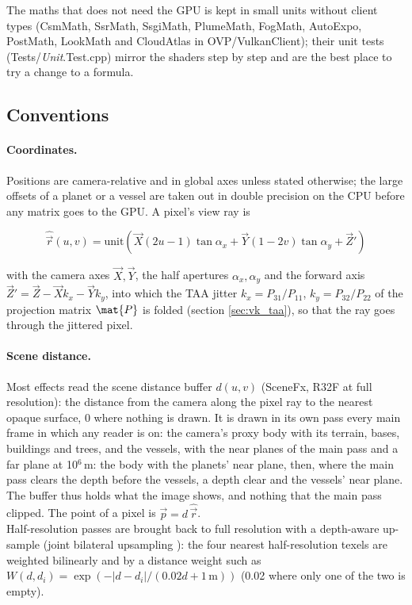 \documentclass[Orbiter Technical Reference.tex]{subfiles}
\begin{document}
\begin{sloppypar}
\noindent The maths that does not need the GPU is kept in small units without client types (CsmMath, SsrMath, SsgiMath, PlumeMath, FogMath, AutoExpo, PostMath, LookMath and CloudAtlas in OVP/VulkanClient); their unit tests (Tests/\textit{Unit}.Test.cpp) mirror the shaders step by step and are the best place to try a change to a formula.


\subsection{Conventions}\label{sec:vk_conv}
\paragraph{Coordinates.} Positions are camera-relative and in global axes unless stated otherwise; the large offsets of a planet or a vessel are taken out in double precision on the CPU before any matrix goes to the GPU. A pixel's view ray is

\[ \hat{\vec{r}}(u,v) = \mathrm{unit}\left( \vec{X} (2u-1) \tan\alpha_x + \vec{Y} (1-2v) \tan\alpha_y + \vec{Z}' \right) \]

\noindent
with the camera axes $\vec{X}, \vec{Y}$, the half apertures $\alpha_x, \alpha_y$ and the forward axis $\vec{Z}' = \vec{Z} - \vec{X} k_x - \vec{Y} k_y$, into which the TAA jitter $k_x = P_{31}/P_{11}$, $k_y = P_{32}/P_{22}$ of the projection matrix $\mat{P}$ is folded (section \ref{sec:vk_taa}), so that the ray goes through the jittered pixel.

\paragraph{Scene distance.} Most effects read the scene distance buffer $d(u,v)$ (SceneFx, R32F at full resolution): the distance from the camera along the pixel ray to the nearest opaque surface, 0 where nothing is drawn. It is drawn in its own pass every main frame in which any reader is on: the camera's proxy body with its terrain, bases, buildings and trees, and the vessels, with the near planes of the main pass and a far plane at 10$^{6}$\,m: the body with the planets' near plane, then, where the main pass clears the depth before the vessels, a depth clear and the vessels' near plane. The buffer thus holds what the image shows, and nothing that the main pass clipped. The point of a pixel is $\vec{p} = d\,\hat{\vec{r}}$.\\
Half-resolution passes are brought back to full resolution with a depth-aware up-sample (joint bilateral upsampling \cite{kopf2007}): the four nearest half-resolution texels are weighted bilinearly and by a distance weight such as $W(d,d_i) = \exp(-|d-d_i|/(0.02d+1\,\mathrm{m}))$ (0.02 where only one of the two is empty).


\end{sloppypar}
\end{document}

